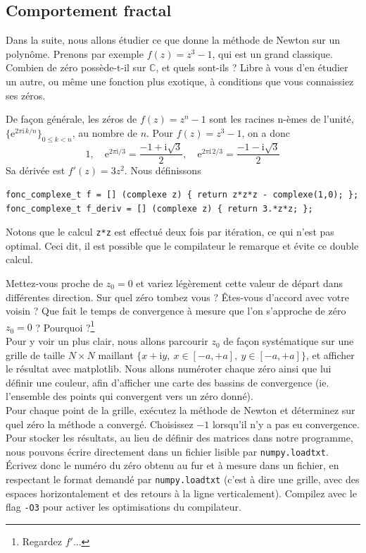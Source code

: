 \documentclass{book}
\newcommand{\inline}[1]{\texttt{#1}}
\begin{document}
\subsection{Comportement fractal}

Dans la suite, nous allons étudier ce que donne la méthode de Newton sur un polynôme. Prenons par exemple $f(z)=z^3-1$, qui est un grand classique. Combien de zéro possède-t-il sur $\mathbb{C}$, et quels sont-ils ? Libre à vous d'en étudier un autre, ou même une fonction plus exotique, à conditions que vous connaissiez ses zéros.

\begin{correction}
De façon générale, les zéros de $f(z)=z^n-1$ sont les racines n-èmes de l'unité, $\{ \mathrm{e}^{2\pi \mathrm{i}\,k/n} \}_{0\leq k < n}$, au nombre de $n$. Pour $f(z)=z^3-1$, on a donc
  \begin{equation*}
  1,\quad \mathrm{e}^{2\pi \mathrm{i}/3}=\frac{-1+\mathrm{i}\sqrt{3}}{2},\quad \mathrm{e}^{2\pi \mathrm{i}\,2/3}=\frac{-1-\mathrm{i}\sqrt{3}}{2}
  \end{equation*}
Sa dérivée est $f'(z)=3 z^2$. Nous définissons
\begin{verbatim}
fonc_complexe_t f = [] (complexe z) { return z*z*z - complexe(1,0); };
fonc_complexe_t f_deriv = [] (complexe z) { return 3.*z*z; };
\end{verbatim}
Notons que le calcul \inline{z*z} est effectué deux fois par itération, ce qui n'est pas optimal. Ceci dit, il est possible que le compilateur le remarque et évite ce double calcul.
\end{correction}

Mettez-vous proche de $z_0=0$ et variez légèrement cette valeur de départ dans différentes direction. Sur quel zéro tombez vous ? Êtes-vous d'accord avec votre voisin ? Que fait le temps de convergence à mesure que l'on s'approche de zéro $z_0=0$ ? Pourquoi ?\footnote{Regardez $f'$...}\\

Pour y voir un plus clair, nous allons parcourir $z_0$ de façon systématique sur une grille de taille $N\times N$ maillant $\{x+\mathrm{i}y,\ x\in[-a,+a],\ y\in[-a,+a]\}$, et afficher le résultat avec matplotlib. Nous allons numéroter chaque zéro ainsi que lui définir une couleur, afin d'afficher une carte des bassins de convergence (ie. l'ensemble des points qui convergent vers un zéro donné).\\

Pour chaque point de la grille, exécutez la méthode de Newton et déterminez sur quel zéro la méthode a convergé. Choisissez $-1$ lorsqu'il n'y a pas eu convergence. Pour stocker les résultats, au lieu de définir des matrices dans notre programme, nous pouvons écrire directement dans un fichier lisible par \texttt{numpy.loadtxt}. Écrivez donc le numéro du zéro obtenu au fur et à mesure dans un fichier, en respectant le format demandé par \texttt{numpy.loadtxt} (c'est à dire une grille, avec des espaces horizontalement et des retours à la ligne verticalement). Compilez avec le flag \texttt{-O3} pour activer les optimisations du compilateur.
\end{document}
